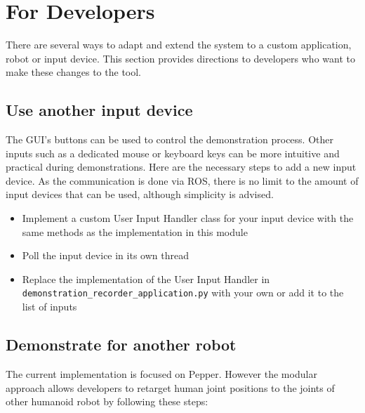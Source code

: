 \documentclass{CSSRforAfrica}
\begin{document}
\newpage
\section{For Developers} \label{sec:fordevelopers}

There are several ways to adapt and extend the system to a custom application, robot or input device. This section provides directions to developers who want to make these changes to the tool. 

\subsection{Use another input device} \label{sec:anotherinput}
The GUI's buttons can be used to control the demonstration process. Other inputs such as a dedicated mouse or keyboard keys can be more intuitive and practical during demonstrations. Here are the necessary steps to add a new input device. As the communication is done via ROS, there is no limit to the amount of input devices that can be used, although simplicity is advised. 

\begin{itemize}[left=0em,  labelsep=1em, listparindent=1em] %
    \item Implement a custom User Input Handler class for your input device with the same methods as the implementation in this module
    \item Poll the input device in its own thread
    \item Replace the implementation of the User Input Handler in \texttt{demonstration\_recorder\_application.py} with your own or add it to the list of inputs 
    
\end{itemize}

\subsection{Demonstrate for another robot}
The current implementation is focused on Pepper. However the modular approach allows developers to retarget human joint positions to the joints of other humanoid robot by following these steps: 
\end{document}
